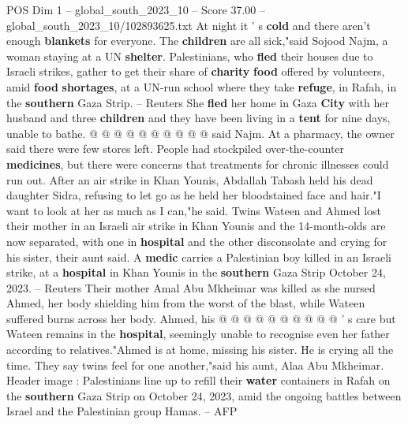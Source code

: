 \begin{textsample}{POS Dim 1 – global\_south\_2023\_10 – Score 37.00 – global\_south\_2023\_10/102893625.txt}
At night it ' s \textbf{cold} and there aren't enough \textbf{blankets} for everyone.
The \textbf{children} are all sick,"said Sojood Najm, a woman staying at a UN \textbf{shelter}.
Palestinians, who \textbf{fled} their houses due to Israeli strikes, gather to get their share of \textbf{charity} \textbf{food} offered by volunteers, amid \textbf{food} \textbf{shortages}, at a UN-run school where they take \textbf{refuge}, in Rafah, in the \textbf{southern} Gaza Strip. -- Reuters She \textbf{fled} her home in Gaza \textbf{City} with her husband and three \textbf{children} and they have been living in a \textbf{tent} for nine days, unable to bathe. @ @ @ @ @ @ @ @ @ @ said Najm.
At a pharmacy, the owner said there were few stores left.
People had stockpiled over-the-counter \textbf{medicines}, but there were concerns that treatments for chronic illnesses could run out.
After an air strike in Khan Younis, Abdallah Tabash held his dead daughter Sidra, refusing to let go as he held her bloodstained face and hair."I want to look at her as much as I can,"he said.
Twins Wateen and Ahmed lost their mother in an Israeli air strike in Khan Younis and the 14-month-olds are now separated, with one in \textbf{hospital} and the other disconsolate and crying for his sister, their aunt said.
A \textbf{medic} carries a Palestinian boy killed in an Israeli strike, at a \textbf{hospital} in Khan Younis in the \textbf{southern} Gaza Strip October 24, 2023. -- Reuters Their mother Amal Abu Mkheimar was killed as she nursed Ahmed, her body shielding him from the worst of the blast, while Wateen suffered burns across her body.
Ahmed, his @ @ @ @ @ @ @ @ @ @ ' s care but Wateen remains in the \textbf{hospital}, seemingly unable to recognise even her father according to relatives."Ahmed is at home, missing his sister.
He is crying all the time.
They say twins feel for one another,"said his aunt, Alaa Abu Mkheimar.
Header image : Palestinians line up to refill their \textbf{water} containers in Rafah on the \textbf{southern} Gaza Strip on October 24, 2023, amid the ongoing battles between Israel and the Palestinian group Hamas. -- AFP

\end{textsample}
